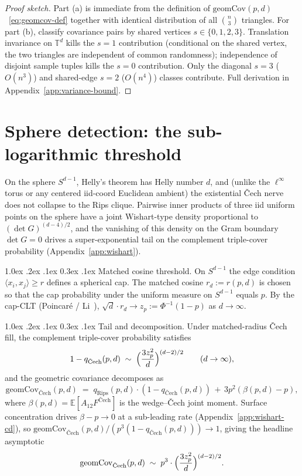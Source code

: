 \documentclass[reqno,12pt]{amsart}
\makeatletter
\renewcommand\paragraph{\@startsection{paragraph}{4}{\z@}%
  {1.0ex \@plus .2ex \@minus .1ex}%
  {0.3ex \@plus .1ex}%
  {\normalfont\normalsize\bfseries}}
\newcommand{\geomCov}{\mathrm{geomCov}}
\newcommand{\TT}{\mathbb{T}}         %
\newcommand{\EE}{\mathbb{E}}
\theoremstyle{plain}
\theoremstyle{definition}
\theoremstyle{remark}
\makeatother
\begin{document}
\begin{proof}[Proof sketch] Part (a) is immediate from the definition of
$\geomCov(p, d)$~\eqref{eq:geomcov-def} together with identical distribution of all
$\binom{n}{3}$ triangles. For part (b), classify covariance pairs by shared vertices
$s \in \{0, 1, 2, 3\}$. Translation invariance on $\TT^d$ kills the $s = 1$ contribution
(conditional on the shared vertex, the two triangles are independent of common
randomness); independence of disjoint sample tuples kills the $s = 0$ contribution. Only
the diagonal $s = 3$ ($O(n^3)$) and shared-edge $s = 2$ ($O(n^4)$) classes contribute.
Full derivation in Appendix~\ref{app:variance-bound}.
\end{proof}

\section{Sphere detection: the sub-logarithmic threshold}\label{sec:sphere-detection}

On the sphere $S^{d-1}$, Helly's theorem has Helly number $d$, and (unlike the
$\ell^\infty$ torus or any centered iid-coord Euclidean ambient) the existential
\v{C}ech nerve does not collapse to the Rips clique. Pairwise inner products of three
iid uniform points on the sphere have a joint Wishart-type density proportional to
$(\det G)^{(d-4)/2}$, and the vanishing of this density on the Gram boundary
$\det G = 0$ drives a super-exponential tail on the complement triple-cover
probability (Appendix~\ref{app:wishart}).

\paragraph{Matched cosine threshold.}
On $S^{d-1}$ the edge condition $\langle x_i, x_j \rangle \ge r$ defines a spherical
cap. The matched cosine $r_d := r(p, d)$ is chosen so that the cap probability under the
uniform measure on $S^{d-1}$ equals $p$. By the cap-CLT (Poincar\'e / Li~\cite{Li2011}),
$\sqrt d \cdot r_d \to z_p := \Phi^{-1}(1 - p)$ as $d \to \infty$.

\paragraph{Tail and decomposition.}
Under matched-radius \v{C}ech fill, the complement triple-cover probability satisfies
\[
  1 - q_{\text{\v{C}ech}}(p, d) \;\sim\; \Bigl(\frac{3 z_p^2}{d}\Bigr)^{(d-2)/2}
  \qquad (d \to \infty),
\]
and the geometric covariance decomposes as
\[
  \geomCov_{\text{\v{C}ech}}(p, d)
    \;=\; q_{\text{Rips}}(p, d) \cdot (1 - q_{\text{\v{C}ech}}(p, d))
        \,+\, 3 p^2 (\beta(p, d) - p),
\]
where $\beta(p, d) = \EE[A_{12} F^{\text{\v{C}ech}}]$ is the wedge--\v{C}ech joint
moment. Surface concentration drives $\beta - p \to 0$ at a sub-leading rate
(Appendix~\ref{app:wishart-cd}), so
$\geomCov_{\text{\v{C}ech}}(p, d) / (p^3 (1 - q_{\text{\v{C}ech}}(p, d))) \to 1$, giving
the headline asymptotic
\[
  \geomCov_{\text{\v{C}ech}}(p, d) \;\sim\; p^3 \cdot \Bigl(\frac{3 z_p^2}{d}\Bigr)^{(d-2)/2}.
\]
\end{document}
